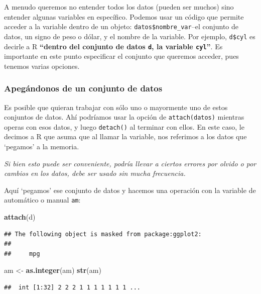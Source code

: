 \documentclass[
]{article}
\newenvironment{Shaded}{\begin{snugshade}}{\end{snugshade}}
\newcommand{\FunctionTok}[1]{\textcolor[rgb]{0.13,0.29,0.53}{\textbf{#1}}}
\newcommand{\NormalTok}[1]{#1}
\newcommand{\OtherTok}[1]{\textcolor[rgb]{0.56,0.35,0.01}{#1}}
\begin{document}
A menudo queremos no entender todos los datos (pueden ser muchos) sino
entender algunas variables en específico. Podemos usar un código que
permite acceder a la variable dentro de un objeto:
\texttt{datos\$nombre\_var}--el conjunto de datos, un signo de peso o
dólar, y el nombre de la variable. Por ejemplo, \texttt{d\$cyl} es
decirle a R \textbf{``dentro del conjunto de datos \texttt{d}, la
variable \texttt{cyl}''}. Es importante en este punto especificar el
conjunto que queremos acceder, pues tenemos varias opciones.

\subsubsection{Apegándonos de un conjunto de
datos}\label{apeguxe1ndonos-de-un-conjunto-de-datos}

Es posible que quieran trabajar con sólo uno o mayormente uno de estos
conjuntos de datos. Ahí podríamos usar la opción de
\texttt{attach(datos)} mientras operas con esos datos, y luego
\texttt{detach()} al terminar con ellos. En este caso, le decimos a R
que asuma que al llamar la variable, nos referimos a los datos que
`pegamos' a la memoria.

\emph{Si bien esto puede ser conveniente, podría llevar a ciertos
errores por olvido o por cambios en los datos, debe ser usado sin mucha
frecuencia.}

Aquí `pegamos' ese conjunto de datos y hacemos una operación con la
variable de automático o manual \texttt{am}:

\begin{Shaded}
\begin{Highlighting}[]
\FunctionTok{attach}\NormalTok{(d)}
\end{Highlighting}
\end{Shaded}

\begin{verbatim}
## The following object is masked from package:ggplot2:
## 
##     mpg
\end{verbatim}

\begin{Shaded}
\begin{Highlighting}[]
\NormalTok{am }\OtherTok{\textless{}{-}} \FunctionTok{as.integer}\NormalTok{(am)}
\FunctionTok{str}\NormalTok{(am)}
\end{Highlighting}
\end{Shaded}

\begin{verbatim}
##  int [1:32] 2 2 2 1 1 1 1 1 1 1 ...
\end{verbatim}
\end{document}
